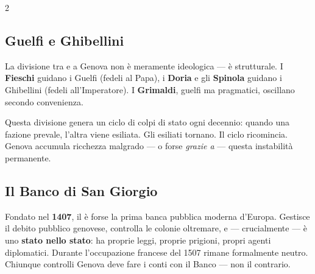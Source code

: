 \begin{multicols}{2}

\subsection{Guelfi e Ghibellini}


La divisione tra  e  a Genova non è
meramente ideologica — è strutturale. I \textbf{Fieschi} guidano i Guelfi
(fedeli al Papa), i \textbf{Doria} e gli \textbf{Spinola} guidano i
Ghibellini (fedeli all'Imperatore). I \textbf{Grimaldi}, guelfi ma
pragmatici, oscillano secondo convenienza.

Questa divisione genera un ciclo di colpi di stato ogni decennio: quando
una fazione prevale, l'altra viene esiliata. Gli esiliati tornano.
Il ciclo ricomincia. Genova accumula ricchezza malgrado — o forse
\textit{grazie a} — questa instabilità permanente.

\columnbreak

\subsection{Il Banco di San Giorgio}


Fondato nel \textbf{1407}, il  è forse la
prima banca pubblica moderna d'Europa. Gestisce il debito pubblico
genovese, controlla le colonie oltremare, e — crucialmente — è uno
\textbf{stato nello stato}: ha proprie leggi, proprie prigioni, propri
agenti diplomatici. Durante l'occupazione francese del 1507 rimane
formalmente neutro. Chiunque controlli Genova deve fare i conti con il
Banco — non il contrario.

\end{multicols}

